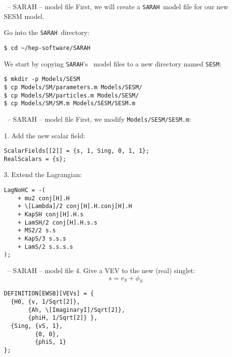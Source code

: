 \documentclass[11pt]{beamer}
\newcommand{\SARAH}{\texttt{SARAH}}
\newcommand{\SM}{\text{SM}}
\begin{document}
\begin{frame}[fragile]{\insertsection\ -- SARAH -- model file}
  First, we will create a \SARAH\ model file for our new SESM model.

  \bigskip

  Go into the \SARAH\ directory:
  \begin{lstlisting}
$ cd ~/hep-software/SARAH\end{lstlisting}%
  We start by copying \SARAH's \SM\ model files to a new directory named
  \texttt{SESM}:
  \begin{lstlisting}
$ mkdir -p Models/SESM
$ cp Models/SM/parameters.m Models/SESM/
$ cp Models/SM/particles.m Models/SESM/
$ cp Models/SM/SM.m Models/SESM/SESM.m\end{lstlisting}%
\end{frame}


\begin{frame}[fragile]{\insertsection\ -- SARAH -- model file}
  First, we modify \texttt{Models/SESM/SESM.m}:

  \medskip

  1. Add the new scalar field:
  \begin{lstlisting}
ScalarFields[[2]] = {s, 1, Sing, 0, 1, 1};
RealScalars = {s};\end{lstlisting}
  3. Extend the Lagrangian:
  \begin{lstlisting}
LagNoHC = -(
    + mu2 conj[H].H
    + \[Lambda]/2 conj[H].H.conj[H].H
    + KapSH conj[H].H.s
    + LamSH/2 conj[H].H.s.s
    + MS2/2 s.s
    + KapS/3 s.s.s
    + LamS/2 s.s.s.s
);\end{lstlisting}
\end{frame}


\begin{frame}[fragile]{\insertsection\ -- SARAH -- model file}
  4. Give a VEV to the new (real) singlet:
  \begin{equation*}
    s = v_S + \phi_S
  \end{equation*}
  \begin{lstlisting}
DEFINITION[EWSB][VEVs] = {
  {H0, {v, 1/Sqrt[2]},
       {Ah, \[ImaginaryI]/Sqrt[2]},
       {phiH, 1/Sqrt[2]} },
  {Sing, {vS, 1},
         {0, 0},
         {phiS, 1}
};\end{lstlisting}
\end{frame}
\end{document}
